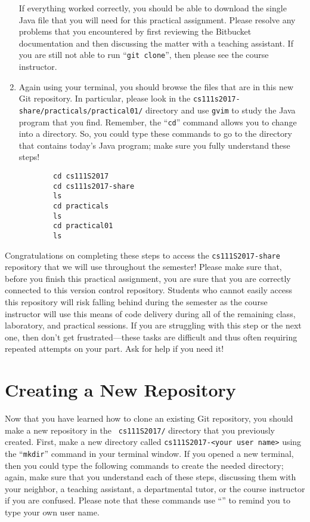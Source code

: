 \begin{enumerate}
    If everything worked correctly, you should be able to download the single Java file that you will need for this
    practical assignment. Please resolve any problems that you encountered by first reviewing the Bitbucket
    documentation and then discussing the matter with a teaching assistant. If you are still not able to run ``{\tt git
    clone}'', then please see the course instructor.

  \item Again using your terminal, you should browse the files that are in this new Git repository. In particular,
    please look in the {\tt cs111s2017-share/practicals/practical01/} directory and use {\tt gvim} to study the Java
    program that you find.  Remember, the ``{\tt cd}'' command allows you to change into a directory. So, you could type
    these commands to go to the directory that contains today's Java program; make sure you fully understand these
    steps!

    \vspace*{-.1in}
    \begin{verbatim}
        cd cs111S2017
        cd cs111s2017-share
        ls
        cd practicals
        ls
        cd practical01
        ls
    \end{verbatim}
    \vspace*{-.5in}

    \end{enumerate}

    Congratulations on completing these steps to access the {\tt cs111S2017-share} repository that we will use
    throughout the semester! Please make sure that, before you finish this practical assignment, you are sure that you
    are correctly connected to this version control repository. Students who cannot easily access this repository will
    risk falling behind during the semester as the course instructor will use this means of code delivery during all of
    the remaining class, laboratory, and practical sessions. If you are struggling with this step or the next one, then
    don't get frustrated---these tasks are difficult and thus often requiring repeated attempts on your part. Ask for
    help if you need it!

\section*{Creating a New Repository}

Now that you have learned how to clone an existing Git repository, you should make a new repository in the {\tt
cs111S2017/} directory that you previously created.  First, make a new directory called {\tt cs111S2017-<your user
name>} using the ``{\tt mkdir}'' command in your terminal window. If you opened a new terminal, then you could type the
following commands to create the needed directory; again, make sure that you understand each of these steps, discussing
them with your neighbor, a teaching assistant, a departmental tutor, or the course instructor if you are confused.
Please note that these commands use ``{\tt <your user name>}'' to remind you to type your own user name.

